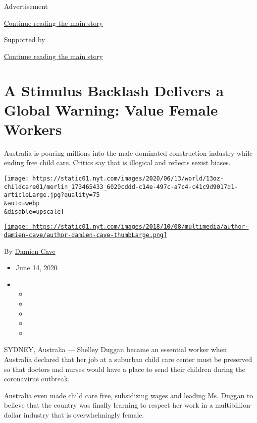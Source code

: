 Advertisement

\protect\hyperlink{after-top}{Continue reading the main story}

Supported by

\protect\hyperlink{after-sponsor}{Continue reading the main story}

\hypertarget{a-stimulus-backlash-delivers-a-global-warning-value-female-workers}{%
\section{A Stimulus Backlash Delivers a Global Warning: Value Female
Workers}\label{a-stimulus-backlash-delivers-a-global-warning-value-female-workers}}

Australia is pouring millions into the male-dominated construction
industry while ending free child care. Critics say that is illogical and
reflects sexist biases.

\texttt{[image: https://static01.nyt.com/images/2020/06/13/world/13oz-childcare01/merlin\_173465433\_6020cddd-c14e-497c-a7c4-c41c9d9017d1-articleLarge.jpg?quality=75\\\&auto=webp\\\&disable=upscale]}

\href{https://www.nytimes.com/by/damien-cave}{\texttt{[image: https://static01.nyt.com/images/2018/10/08/multimedia/author-damien-cave/author-damien-cave-thumbLarge.png]}}

By \href{https://www.nytimes.com/by/damien-cave}{Damien Cave}

\begin{itemize}
\item
  June 14, 2020
\item
  \begin{itemize}
  \item
  \item
  \item
  \item
  \item
  \end{itemize}
\end{itemize}

SYDNEY, Australia --- Shelley Duggan became an essential worker when
Australia declared that her job at a suburban child care center must be
preserved so that doctors and nurses would have a place to send their
children during the coronavirus outbreak.

Australia even made child care free, subsidizing wages and leading Ms.
Duggan to believe that the country was finally learning to respect her
work in a multibillion-dollar industry that is overwhelmingly female.

